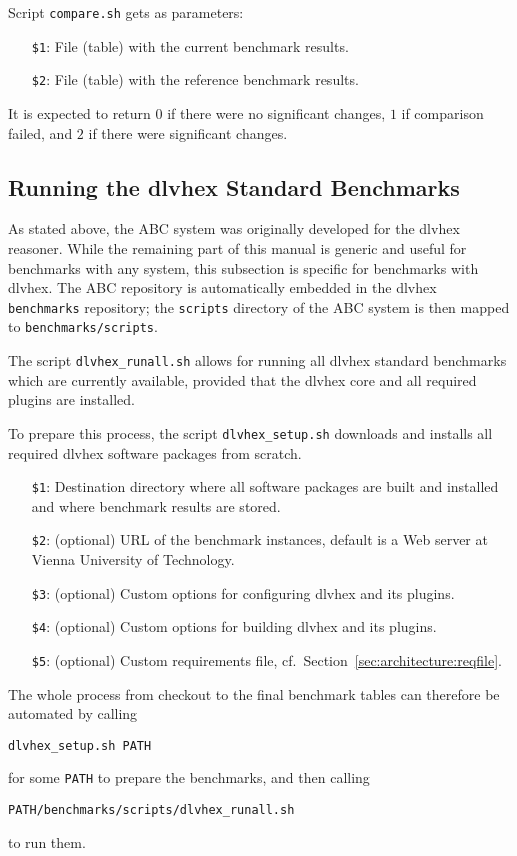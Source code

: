 \documentclass[a4paper]{article}
\newcommand{\dlvhex}{{\sc dlvhex}}
\newcommand{\abcs}{{ABC}}
\begin{document}
			Script {\tt compare.sh} gets as parameters:
			    \begin{itemize}
					\item[{\tt \$1}:] File (table) with the current benchmark results.
					\item[{\tt \$2}:] File (table) with the reference benchmark results.
			    \end{itemize}
			
			It is expected to return $0$ if there were no significant changes,
			$1$ if comparison failed, and $2$ if there were significant changes.

		\subsection{Running the \dlvhex{} Standard Benchmarks}

			As stated above, the \abcs{} system was originally developed for the \dlvhex{} reasoner.
			While the remaining part of this manual is generic and useful for benchmarks with any system,
			this subsection is specific for benchmarks with \dlvhex{}.
			The \abcs{} repository is automatically embedded in the \dlvhex{} {\tt benchmarks} repository;
			the {\tt scripts} directory of the \abcs{} system is then mapped to {\tt benchmarks/scripts}.

			The script {\tt dlvhex\_runall.sh} allows for
			running all \dlvhex{} standard benchmarks which are currently available,
			provided that the {\sc dlvhex} core and all required plugins are installed.

			To prepare this process, the script {\tt dlvhex\_setup.sh} downloads and installs all required {\sc dlvhex} software packages
			from scratch.

			\medskip{}
			\begin{itemize}
				\item[{\tt \$1}:] Destination directory where all software packages are built and installed and where benchmark results are stored.
				\item[{\tt \$2}:] (optional) URL of the benchmark instances, default is a Web server at Vienna University of Technology.
				\item[{\tt \$3}:] (optional) Custom options for configuring {\sc dlvhex} and its plugins.
				\item[{\tt \$4}:] (optional) Custom options for building {\sc dlvhex} and its plugins.
				\item[{\tt \$5}:] (optional) Custom requirements file, cf.~Section~\ref{sec:architecture:reqfile}.				
			\end{itemize}

			The whole process from checkout to the final benchmark tables can therefore be automated by calling
			\begin{center}
				{\tt dlvhex\_setup.sh PATH}
			\end{center}
			for some {\tt PATH} to prepare the benchmarks, and then calling
			\begin{center}
				{\tt PATH/benchmarks/scripts/dlvhex\_runall.sh}
			\end{center}
			to run them.
\end{document}
